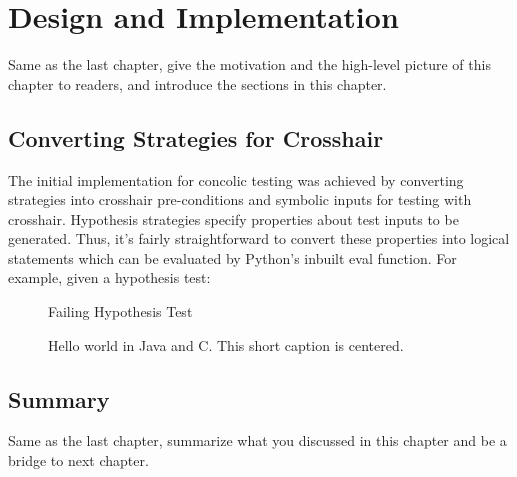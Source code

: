 \chapter{Design and Implementation}
\label{cha:design}

Same as the last chapter, give the motivation and the high-level
picture of this chapter to readers, and introduce the sections in this
chapter.

\section{Converting Strategies for Crosshair}
\label{sec:des-hotpath}

The initial implementation for concolic testing was achieved by converting strategies into crosshair pre-conditions and symbolic inputs for testing with crosshair. Hypothesis strategies specify properties about test inputs to be generated. Thus, it's fairly straightforward to convert these properties into logical statements which can be evaluated by Python’s inbuilt eval function. For example, given a hypothesis test:

\begin{figure}[H]
    
    \caption{Failing Hypothesis Test}
    \label{fig:python:hello}
  \caption{Hello world in Java and C. This short caption is centered.}
  \label{fig:helloworld}
\end{figure}

\section{Summary}
Same as the last chapter, summarize what you discussed in this chapter and
be a bridge to next chapter.
